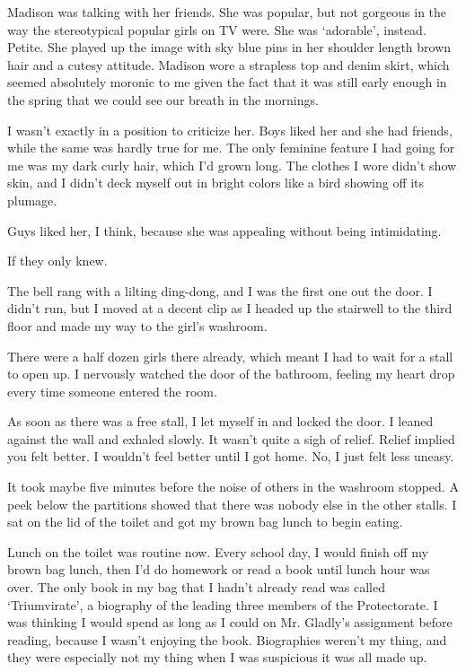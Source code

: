 Madison was talking with her friends. She was popular, but not gorgeous in the way the stereotypical popular girls on TV were. She was `adorable', instead. Petite. She played up the image with sky blue pins in her shoulder length brown hair and a cutesy attitude. Madison wore a strapless top and denim skirt, which seemed absolutely moronic to me given the fact that it was still early enough in the spring that we could see our breath in the mornings.

I wasn't exactly in a position to criticize her. Boys liked her and she had friends, while the same was hardly true for me. The only feminine feature I had going for me was my dark curly hair, which I'd grown long. The clothes I wore didn't show skin, and I didn't deck myself out in bright colors like a bird showing off its plumage.

Guys liked her, I think, because she was appealing without being intimidating.

If they only knew.

The bell rang with a lilting ding-dong, and I was the first one out the door. I didn't run, but I moved at a decent clip as I headed up the stairwell to the third floor and made my way to the girl's washroom.

There were a half dozen girls there already, which meant I had to wait for a stall to open up. I nervously watched the door of the bathroom, feeling my heart drop every time someone entered the room.

As soon as there was a free stall, I let myself in and locked the door. I leaned against the wall and exhaled slowly. It wasn't quite a sigh of relief. Relief implied you felt better. I wouldn't feel better until I got home. No, I just felt less uneasy.

It took maybe five minutes before the noise of others in the washroom stopped. A peek below the partitions showed that there was nobody else in the other stalls. I sat on the lid of the toilet and got my brown bag lunch to begin eating.

Lunch on the toilet was routine now. Every school day, I would finish off my brown bag lunch, then I'd do homework or read a book until lunch hour was over. The only book in my bag that I hadn't already read was called `Triumvirate', a biography of the leading three members of the Protectorate. I was thinking I would spend as long as I could on Mr. Gladly's assignment before reading, because I wasn't enjoying the book. Biographies weren't my thing, and they were especially not my thing when I was suspicious it was all made up.

